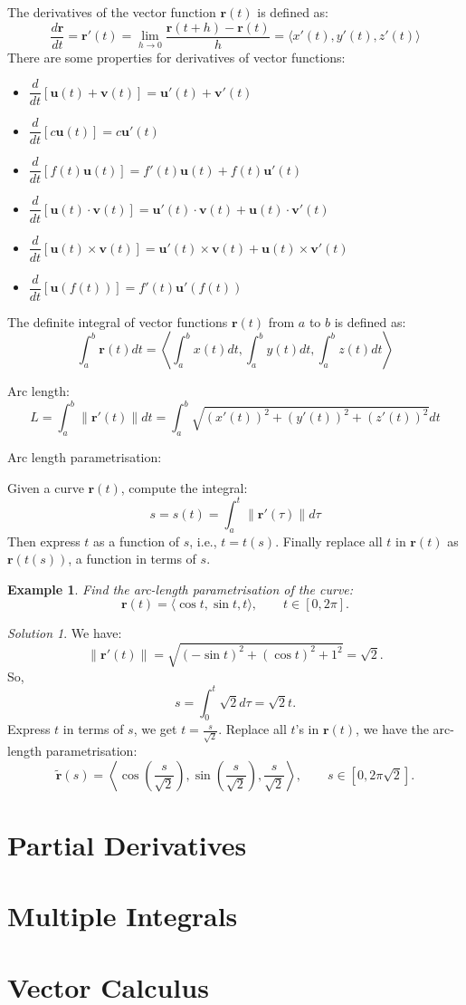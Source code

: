\documentclass{book}
\newtheorem{example}{Example}[chapter]
\theoremstyle{remark}
\newtheorem*{solution}{Solution}
\begin{document}
The derivatives of the vector function $\mathbf{r}(t)$ is defined as:
\[
    \dfrac{d\mathbf{r}}{dt} = \mathbf{r}'(t) = \lim_{h \to 0} \frac{\mathbf{r}(t + h) - \mathbf{r}(t)}{h} = \langle x'(t), y'(t), z'(t) \rangle
\]
There are some properties for derivatives of vector functions:
\begin{itemize}
    \item $\dfrac{d}{dt} [\mathbf{u}(t) + \mathbf{v}(t)] = \mathbf{u}'(t) + \mathbf{v}'(t)$
    \item $\dfrac{d}{dt} [c\mathbf{u}(t)] = c\mathbf{u}'(t)$
    \item $\dfrac{d}{dt} [f(t) \mathbf{u}(t)] = f'(t) \mathbf{u}(t) + f(t) \mathbf{u}'(t)$
    \item $\dfrac{d}{dt} [\mathbf{u}(t) \cdot \mathbf{v}(t)] = \mathbf{u}'(t) \cdot \mathbf{v}(t) + \mathbf{u}(t) \cdot \mathbf{v}'(t)$
    \item $\dfrac{d}{dt} [\mathbf{u}(t) \times \mathbf{v}(t)] = \mathbf{u}'(t) \times \mathbf{v}(t) + \mathbf{u}(t) \times \mathbf{v}'(t)$
    \item $\dfrac{d}{dt} [\mathbf{u}(f(t))] = f'(t) \mathbf{u}'(f(t))$
\end{itemize}

The definite integral of vector functions $\mathbf{r}(t)$ from $a$ to $b$ is defined as:
\[
    \int_a^b \mathbf{r}(t) dt = \left\langle \int_a^b x(t) dt, \int_a^b y(t) dt, \int_a^b z(t) dt \right\rangle
\]

Arc length:
\[
    L = \int_a^b \| \mathbf{r}'(t) \| dt = \int_a^b \sqrt{(x'(t))^2 + (y'(t))^2 + (z'(t))^2} dt
\]

Arc length parametrisation:

Given a curve $\mathbf{r}(t)$, compute the integral:
\[
    s = s(t) = \int_a^t \| \mathbf{r}'(\tau) \| d\tau
\]
Then express $t$ as a function of $s$, i.e., $t = t(s)$. Finally replace all $t$ in $\mathbf{r}(t)$ as $\mathbf{r}(t(s))$, a function in terms of $s$.

\begin{example}
    Find the arc-length parametrisation of the curve:
    \[
        \mathbf{r}(t) = \langle \cos t, \sin t, t \rangle, \qquad t \in [0, 2\pi].
    \]
\end{example}
\begin{solution}
    We have:
    \[
        \| \mathbf{r}'(t) \| = \sqrt{(-\sin t)^2 + (\cos t)^2 + 1^2} = \sqrt{2}.
    \]
    So,
    \[
        s = \int_0^t \sqrt{2} d\tau = \sqrt{2} t.
    \]
    Express $t$ in terms of $s$, we get $t = \frac{s}{\sqrt{2}}$. Replace all $t$'s in $\mathbf{r}(t)$, we have the arc-length parametrisation:
    \[
        \tilde{\mathbf{r}}(s) = \left\langle \cos\left(\frac{s}{\sqrt{2}}\right), \sin\left(\frac{s}{\sqrt{2}}\right), \frac{s}{\sqrt{2}} \right\rangle, \qquad s \in [0, 2\pi\sqrt{2}].
    \]
\end{solution}


\chapter{Partial Derivatives}

\chapter{Multiple Integrals}

\chapter{Vector Calculus}
\end{document}
